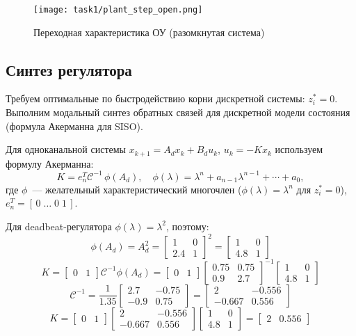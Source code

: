 \begin{figure}[H]
    \centering
    \texttt{[image: task1/plant\_step\_open.png]}
    \caption{Переходная характеристика ОУ (разомкнутая система)}
    \label{fig:task1_open}
\end{figure}

\subsection{Синтез регулятора}
Требуем оптимальные по быстродействию корни дискретной системы: $z_i^*=0$. Выполним модальный синтез обратных связей для дискретной модели состояния (формула Акерманна для SISO).

Для одноканальной системы $x_{k+1}=A_d x_k + B_d u_k$, $u_k=-Kx_k$ используем формулу Акерманна:
\[\label{eq:ack}
K = e_n^T \mathcal C^{-1}\, \phi(A_d),\quad \phi(\lambda)=\lambda^{n}+a_{n-1}\lambda^{n-1}+\cdots+a_0,
\]
где $\phi$~--- желательный характеристический многочлен ($\phi(\lambda)=\lambda^n$ для $z_i^*=0$), $e_n^T = [\,0\;\dots\;0\;1\,]$.

Для deadbeat-регулятора $\phi(\lambda)=\lambda^2$, поэтому:
\[
\phi(A_d) = A_d^2 = \begin{bmatrix}1 & 0\\ 2.4 & 1\end{bmatrix}^2 = \begin{bmatrix}1 & 0\\ 4.8 & 1\end{bmatrix}
\]
\[
K = \begin{bmatrix}0 & 1\end{bmatrix} \mathcal C^{-1} \phi(A_d) = \begin{bmatrix}0 & 1\end{bmatrix} \begin{bmatrix}0.75 & 0.75\\ 0.9 & 2.7\end{bmatrix}^{-1} \begin{bmatrix}1 & 0\\ 4.8 & 1\end{bmatrix}
\]
\[
\mathcal C^{-1} = \frac{1}{1.35}\begin{bmatrix}2.7 & -0.75\\ -0.9 & 0.75\end{bmatrix} = \begin{bmatrix}2 & -0.556\\ -0.667 & 0.556\end{bmatrix}
\]
\[
K = \begin{bmatrix}0 & 1\end{bmatrix} \begin{bmatrix}2 & -0.556\\ -0.667 & 0.556\end{bmatrix} \begin{bmatrix}1 & 0\\ 4.8 & 1\end{bmatrix} = \begin{bmatrix}2 & 0.556\end{bmatrix}
\]

